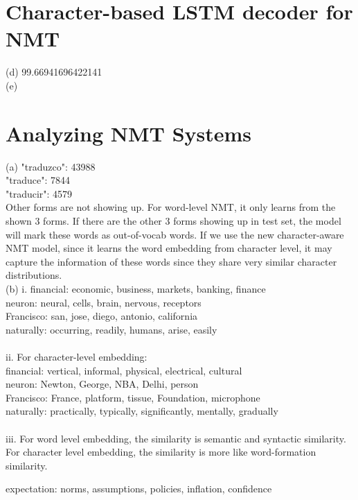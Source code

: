 \documentclass[11pt]{article}
\begin{document}
\section{Character-based LSTM decoder for NMT}
(d) 99.66941696422141\\
(e)
\section{Analyzing NMT Systems}
(a) "traduzco": 43988\\
"traduce": 7844\\
"traducir": 4579\\
Other forms are not showing up. For word-level NMT, it only learns from the shown 3 forms. If there are the other 3 forms showing up in test set, the model will mark these words as out-of-vocab words. If we use the new character-aware NMT model, since it learns the word embedding from character level, it may capture the information of these words since they share very similar character distributions.\\
(b) i. financial: economic, business, markets, banking, finance\\
neuron: neural, cells, brain, nervous, receptors\\
Francisco: san, jose, diego, antonio, california\\
naturally: occurring, readily, humans, arise, easily\\\\
ii. For character-level embedding:\\
financial: vertical, informal, physical, electrical, cultural\\
neuron: Newton, George, NBA, Delhi, person\\
Francisco: France, platform, tissue, Foundation, microphone\\
naturally: practically, typically, significantly, mentally, gradually\\\\
iii. For word level embedding, the similarity is semantic and syntactic similarity. For character level embedding, the similarity is more like word-formation similarity.

expectation: norms, assumptions, policies, inflation, confidence
\end{document}
